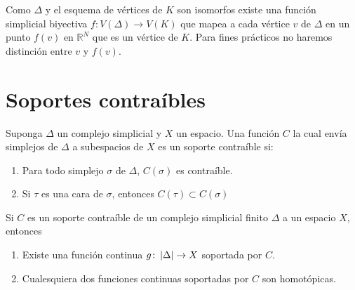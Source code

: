 Como $\Delta$ y el esquema de vértices de $K$ son isomorfos existe una función simplicial biyectiva $f\colon V(\Delta)\rightarrow V(K)$ que mapea a cada vértice $v$ de $\Delta$ en un punto $f(v)$ en $\mathbb{R}^N$ que es un vértice de $K$. Para fines prácticos no haremos distinción entre $v$ y $f(v)$.

\section{Soportes contraíbles}
\begin{Defi}
Suponga $\Delta$ un complejo simplicial y $X$ un espacio. Una función $C$ la cual envía simplejos de $\Delta$ a subespacios de $X$ es un soporte contraíble si:
\begin{enumerate}
\item Para todo simplejo $\sigma$ de $\Delta$, $C(\sigma)$ es contraíble.
\item Si $\tau$ es una cara de $\sigma$, entonces $C(\tau)\subset C(\sigma)$
\end{enumerate}
\end{Defi}

\begin{Teo}
Si $C$ es un soporte contraíble de un complejo simplicial finito $\Delta$ a un espacio $X$, entonces
\begin{enumerate}
\item Existe una función continua $g\colon \left| \Delta \right|\rightarrow X$ soportada por $C$.
\item Cualesquiera dos funciones continuas soportadas por $C$ son homotópicas.
\end{enumerate}
\end{Teo}

